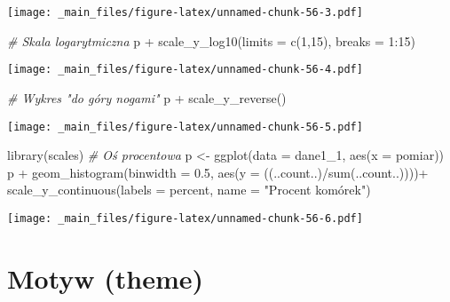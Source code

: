 \documentclass[
]{book}
\newenvironment{Shaded}{\begin{snugshade}}{\end{snugshade}}
\newcommand{\AttributeTok}[1]{\textcolor[rgb]{0.77,0.63,0.00}{#1}}
\newcommand{\CommentTok}[1]{\textcolor[rgb]{0.56,0.35,0.01}{\textit{#1}}}
\newcommand{\DecValTok}[1]{\textcolor[rgb]{0.00,0.00,0.81}{#1}}
\newcommand{\FloatTok}[1]{\textcolor[rgb]{0.00,0.00,0.81}{#1}}
\newcommand{\FunctionTok}[1]{\textcolor[rgb]{0.00,0.00,0.00}{#1}}
\newcommand{\NormalTok}[1]{#1}
\newcommand{\OtherTok}[1]{\textcolor[rgb]{0.56,0.35,0.01}{#1}}
\newcommand{\SpecialCharTok}[1]{\textcolor[rgb]{0.00,0.00,0.00}{#1}}
\newcommand{\StringTok}[1]{\textcolor[rgb]{0.31,0.60,0.02}{#1}}
\begin{document}
\texttt{[image: \_main\_files/figure-latex/unnamed-chunk-56-3.pdf]}

\begin{Shaded}
\begin{Highlighting}[]
\CommentTok{\# Skala logarytmiczna}
\NormalTok{p }\SpecialCharTok{+} \FunctionTok{scale\_y\_log10}\NormalTok{(}\AttributeTok{limits =} \FunctionTok{c}\NormalTok{(}\DecValTok{1}\NormalTok{,}\DecValTok{15}\NormalTok{), }\AttributeTok{breaks =} \DecValTok{1}\SpecialCharTok{:}\DecValTok{15}\NormalTok{)}
\end{Highlighting}
\end{Shaded}

\texttt{[image: \_main\_files/figure-latex/unnamed-chunk-56-4.pdf]}

\begin{Shaded}
\begin{Highlighting}[]
\CommentTok{\# Wykres "do góry nogami"}
\NormalTok{p }\SpecialCharTok{+} \FunctionTok{scale\_y\_reverse}\NormalTok{()}
\end{Highlighting}
\end{Shaded}

\texttt{[image: \_main\_files/figure-latex/unnamed-chunk-56-5.pdf]}

\begin{Shaded}
\begin{Highlighting}[]
\FunctionTok{library}\NormalTok{(scales)}
\CommentTok{\# Oś procentowa}
\NormalTok{p }\OtherTok{\textless{}{-}} \FunctionTok{ggplot}\NormalTok{(}\AttributeTok{data =}\NormalTok{ dane1\_1, }\FunctionTok{aes}\NormalTok{(}\AttributeTok{x =}\NormalTok{ pomiar))}
\NormalTok{p }\SpecialCharTok{+} \FunctionTok{geom\_histogram}\NormalTok{(}\AttributeTok{binwidth =} \FloatTok{0.5}\NormalTok{, }\FunctionTok{aes}\NormalTok{(}\AttributeTok{y =}\NormalTok{ ((..count..)}\SpecialCharTok{/}\FunctionTok{sum}\NormalTok{(..count..))))}\SpecialCharTok{+}
  \FunctionTok{scale\_y\_continuous}\NormalTok{(}\AttributeTok{labels =}\NormalTok{ percent, }\AttributeTok{name =} \StringTok{"Procent komórek"}\NormalTok{)}
\end{Highlighting}
\end{Shaded}

\texttt{[image: \_main\_files/figure-latex/unnamed-chunk-56-6.pdf]}

\hypertarget{motyw-theme}{%
\section{Motyw (theme)}\label{motyw-theme}}
\end{document}
